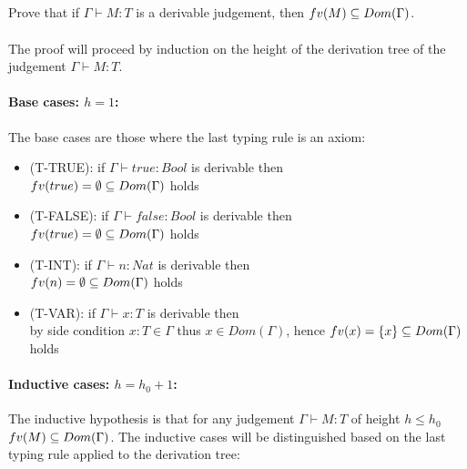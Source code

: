 \subsection{}

Prove that if $\Gamma \vdash M: T$ is a derivable judgement, then
$fv(M) \subseteq Dom(\Gamma)$.\\~\\
The proof will proceed by induction on the height of the derivation tree of the judgement
$\Gamma \vdash M: T$.

\paragraph*{Base cases: $h = 1$:\\}

The base cases are those where the last typing rule is an axiom:

\begin{itemize}
	\item (T-TRUE): if $\Gamma \vdash true: Bool$ is derivable then\\
	      $fv(true) = \emptyset \subseteq Dom(\Gamma)$ holds
	\item (T-FALSE): if $\Gamma \vdash false: Bool$ is derivable then\\
	      $fv(true) = \emptyset \subseteq Dom(\Gamma)$ holds
	\item (T-INT): if $\Gamma \vdash n: Nat$ is derivable then\\
	      $fv(n) = \emptyset \subseteq Dom(\Gamma)$ holds
	\item (T-VAR): if $\Gamma \vdash x: T$ is derivable then\\
	      by side condition $x : T \in \Gamma$ thus $x \in Dom(\Gamma)$, hence
	      $fv(x) = \{x \} \subseteq Dom(\Gamma)$ holds
\end{itemize}

\paragraph*{Inductive cases: $h = h_0 + 1$:\\}

The inductive hypothesis is that for any judgement $\Gamma \vdash M: T$ of height $h \le h_0$
$fv(M) \subseteq Dom(\Gamma)$. The inductive cases will be distinguished based on the last
typing rule applied to the derivation tree:


